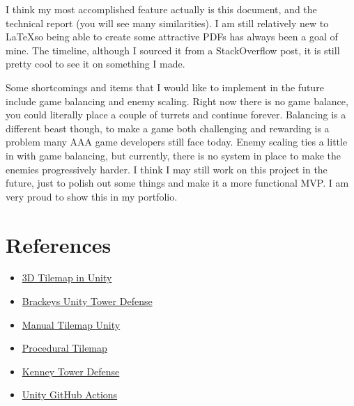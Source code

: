 \documentclass{article}
\begin{document}
I think my most accomplished feature actually is this document, and the technical report (you will see many similarities). I am still relatively new to \LaTeX so being able to create some attractive PDFs has always been a goal of mine. The timeline, although I sourced it from a StackOverflow post, it is still pretty cool to see it on something I made.

Some shortcomings and items that I would like to implement in the future include game balancing and enemy scaling. Right now there is no game balance, you could literally place a couple of turrets and continue forever. Balancing is a different beast though, to make a game both challenging and rewarding is a problem many AAA game developers still face today. Enemy scaling ties a little in with game balancing, but currently, there is no system in place to make the enemies progressively harder. I think I may still work on this project in the future, just to polish out some things and make it a more functional MVP. I am very proud to show this in my portfolio.

\section{References}
\label{sec:References}

\begin{itemize}
    \item \href{https://youtu.be/ulFc6p3hQzQ}{3D Tilemap in Unity}
    \item \href{https://www.youtube.com/playlist?list=PLPV2KyIb3jR4u5jX8za5iU1cqnQPmbzG0}{Brackeys Unity Tower Defense}
    \item \href{https://forum.unity.com/threads/how-can-i-place-a-tile-in-a-tilemap-by-script.508338/}{Manual Tilemap Unity}
    \item \href{https://blog.unity.com/technology/procedural-patterns-you-can-use-with-tilemaps-part-i}{Procedural Tilemap}
    \item \href{https://www.kenney.nl/assets/tower-defense-kit}{Kenney Tower Defense}
    \item \href{https://isaacbroyles.com/gamedev/2020/07/04/unity-github-actions.html}{Unity GitHub Actions}
\end{itemize}
\end{document}
